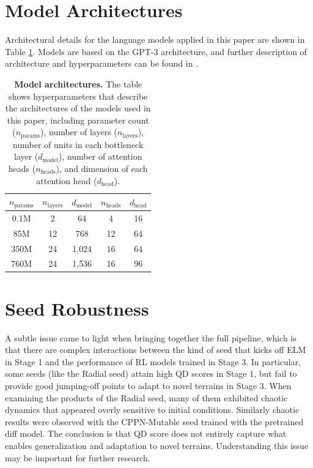 \documentclass{article}
\begin{document}
\section{Model Architectures}
\label{appendix:arch}

Architectural details for the language models applied in this paper are shown in Table \ref{table:arch}. Models are based on the GPT-3 architecture, and further description of
architecture and hyperparameters can be found in \citet{brown2020language}.

\begin{table}[ht!]
\centering
\begin{tabular}{|c c c c c|} 
 \hline
 $n_\textrm{params}$ & $n_\textrm{layers}$ & $d_\textrm{model}$ & $n_\textrm{heads}$ & $d_\textrm{head} $ \\ [0.5ex] 
 \hline\hline
 0.1M & 2 & 64 & 4 & 16 \\ 
 85M & 12 & 768 & 12 & 64 \\
 350M & 24 & 1{,}024 & 16 & 64 \\
 760M & 24 & 1{,}536 & 16 & 96 \\
 \hline
\end{tabular}
	\caption{\textbf{Model architectures.} The table shows hyperparameters that describe the architectures of the models used in this paper, including parameter count ($n_\textrm{params}$), number of layers ($n_\textrm{layers}$), number of units in each bottleneck layer ($d_\textrm{model}$), number of attention heads ($n_\textrm{heads}$), and dimension of each attention head ($d_\textrm{head}$).}
\label{table:arch}
\end{table}

\section{Seed Robustness}
\label{appendix:robustness}

A subtle issue came to light when bringing together the full pipeline, which is that
there are complex interactions between the kind of seed that kicks off ELM
in Stage 1 and the performance of RL models trained in Stage 3.  In particular,
some seeds (like the Radial seed) attain high QD scores in Stage 1, but fail to provide good jumping-off
points to adapt to novel terrains in Stage 3. When examining the products of the Radial seed, 
many of them exhibited chaotic dynamics that appeared overly sensitive to initial conditions. Similarly chaotic
results were observed with the CPPN-Mutable seed trained with the pretrained diff model. The conclusion
is that QD score does not entirely capture what enables generalization and
 adaptation to novel terrains. Understanding this issue may be important for further research.
\end{document}

